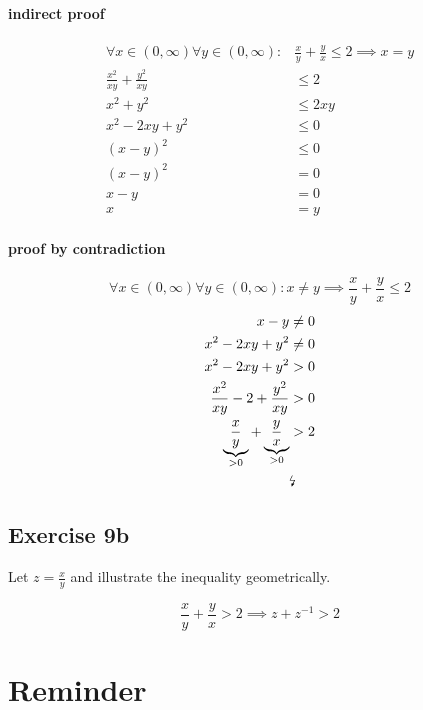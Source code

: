 \documentclass[a4paper]{article}
\theoremstyle{definition}
\begin{document}
\paragraph{indirect proof}
\begin{align*}
  \forall x \in (0, \infty) \forall y \in (0, \infty): &\frac xy + \frac yx \leq 2 \implies x = y \\
   \frac{x^2}{xy} + \frac{y^2}{xy} &\leq 2 \\
   x^2 + y^2 &\leq 2xy \\
   x^2 - 2xy + y^2 &\leq 0 \\
   (x - y)^2 &\leq 0 \\
   (x - y)^2 &= 0 \\
   x - y &= 0 \\
   x &= y
\end{align*}

\paragraph{proof by contradiction}
\[ \forall x \in (0, \infty) \forall y \in (0, \infty): x \neq y \implies \frac xy + \frac yx \leq 2 \]
\begin{align*}
  x - y &\neq 0 \\
  x^2 - 2xy + y^2 &\neq 0 \\
  x^2 - 2xy + y^2 &> 0 \\
  \frac{x^2}{xy} - 2 + \frac{y^2}{xy} &> 0 \\
  \underbrace{\frac{x}{y}}_{>0} + \underbrace{\frac{y}{x}}_{>0} &> 2 \\
    &\text{\lightning}
\end{align*}

\subsection{Exercise 9b}
%
Let $z = \frac{x}{y}$ and illustrate the inequality geometrically.

\[ \frac{x}{y} + \frac{y}{x} > 2 \implies z + z^{-1} > 2 \]


\section{Reminder}
\end{document}
